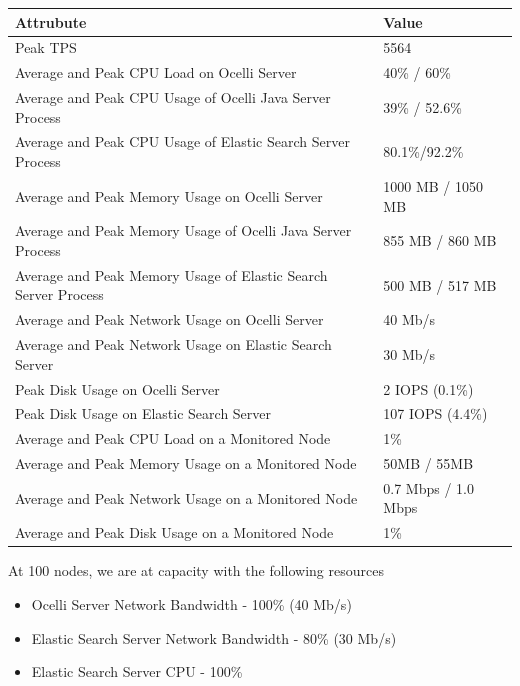 \documentclass{llncs}
\begin{document}
\begin{flushleft}
    \begin{tabular}{ | l | l |}
    \hline
  Attrubute & Value  \\ \hline
  Peak TPS & 5564  \\ \hline
  Average and Peak CPU Load on Ocelli Server &40\% / 60\%  \\ \hline
  Average and Peak CPU Usage of Ocelli Java Server Process & 39\% / 52.6\% \\ \hline
 Average and Peak CPU Usage of Elastic Search Server Process & 80.1\%/92.2\%	  \\ \hline
  Average and Peak Memory Usage on Ocelli Server & 1000 MB / 1050 MB	 \\ \hline
  Average and Peak Memory Usage of Ocelli Java Server Process &	855 MB / 860 MB		 \\ \hline
 Average and Peak Memory Usage of Elastic Search Server Process &	500 MB / 517 MB		 \\ \hline
Average and Peak Network Usage on Ocelli Server &	40 Mb/s 	 \\ \hline
Average and Peak Network Usage on Elastic Search Server & 30 Mb/s 	 \\ \hline
Peak Disk Usage on Ocelli Server &	2 IOPS (0.1\%)		 \\ \hline
Peak Disk Usage on Elastic Search Server &	107 IOPS (4.4\%)		 \\ \hline
Average and Peak CPU Load on a Monitored Node& 	1\% 	 \\ \hline
  Average and Peak Memory Usage on a Monitored Node &	50MB / 55MB	 \\ \hline
Average and Peak Network Usage on a Monitored Node &	0.7 Mbps / 1.0 Mbps		 \\ \hline
  Average and Peak Disk Usage on a Monitored Node &  1\%	\\ 
    \hline
    \end{tabular}
\end{flushleft}

At 100 nodes, we are at capacity with the following resources

\begin{itemize}
\item Ocelli Server Network Bandwidth - 100\% (40 Mb/s)
\item Elastic Search Server Network Bandwidth - 80\% (30 Mb/s)
\item Elastic Search Server CPU - 100\%
\end{itemize}
\end{document}
